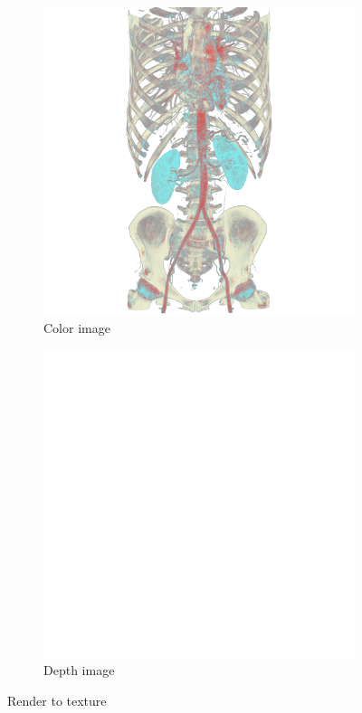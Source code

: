 \begin{figure}[h]
\centering
  \begin{subfigure}[b]{.5\columnwidth}
    \centering
    \includegraphics[width=\textwidth]{colorimage.png}
    \caption{Color image}
    \label{fig:rendertotexturecolor}
  \end{subfigure}%
  \begin{subfigure}[b]{.5\columnwidth}
    \centering
    \includegraphics[width=\textwidth]{depthimage.png}
    \caption{Depth image}
    \label{fig:rendertotexturedepth}
  \end{subfigure}
  \caption{Render to texture}
  \label{fig:rendertotexture}
\end{figure}

